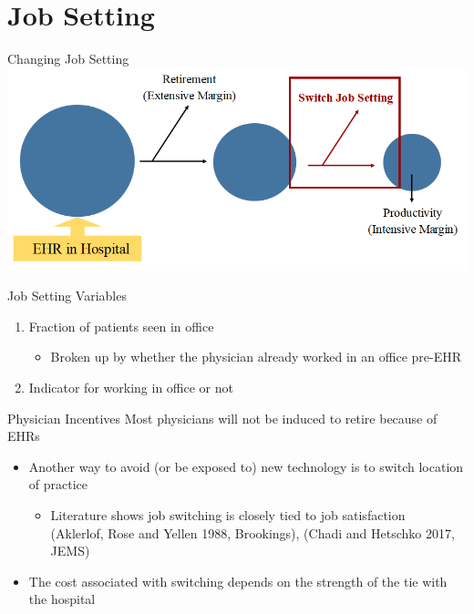 \documentclass[10pt]{beamer}
\begin{document}
\section{Job Setting}




\begin{frame}{Changing Job Setting}
\centering
\includegraphics[scale=.5]{Objects/EHR_FlowChart_JobSwitch.PNG}
\end{frame}

\begin{frame}{Job Setting Variables}
\begin{enumerate}
    \item Fraction of patients seen in office 
                \vspace{3mm}
    \begin{itemize}
        \item Broken up by whether the physician already worked in an office pre-EHR
    \end{itemize}
                \vspace{3mm}
    \item Indicator for working in office or not
\end{enumerate}
\end{frame}



\begin{frame}{Physician Incentives}
Most physicians will not be induced to retire because of EHRs
\begin{itemize}
    \item Another way to avoid (or be exposed to) new technology is to switch location of practice
    \begin{itemize}
                \vspace{3mm}
        \item Literature shows job switching is closely tied to job satisfaction\\ \scriptsize (Aklerlof, Rose and Yellen 1988, Brookings), (Chadi and Hetschko 2017, JEMS)
    \end{itemize}
                \vspace{6mm}
                \pause
    \item The cost associated with switching depends on the strength of the tie with the hospital
    \end{itemize}
\end{frame}
\end{document}
